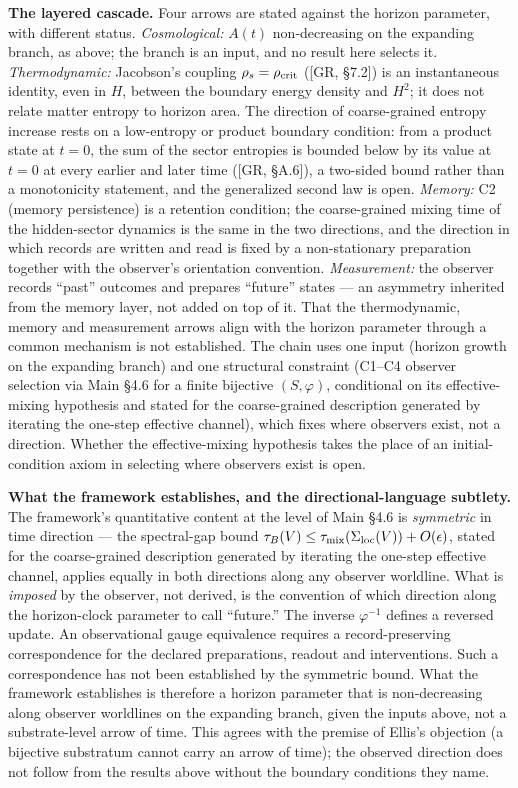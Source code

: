 \documentclass[
]{article}
\begin{document}
\textbf{The layered cascade.} Four arrows are stated against the horizon
parameter, with different status. \emph{Cosmological:} \(A(t)\)
non-decreasing on the expanding branch, as above; the branch is an
input, and no result here selects it. \emph{Thermodynamic:} Jacobson's
coupling \(\rho_s = \rho_{\rm crit}\) ({[}GR, §7.2{]}) is an
instantaneous identity, even in \(H\), between the boundary energy
density and \(H^2\); it does not relate matter entropy to horizon area.
The direction of coarse-grained entropy increase rests on a low-entropy
or product boundary condition: from a product state at \(t = 0\), the
sum of the sector entropies is bounded below by its value at \(t = 0\)
at every earlier and later time ({[}GR, §A.6{]}), a two-sided bound
rather than a monotonicity statement, and the generalized second law is
open. \emph{Memory:} C2 (memory persistence) is a retention condition;
the coarse-grained mixing time of the hidden-sector dynamics is the same
in the two directions, and the direction in which records are written
and read is fixed by a non-stationary preparation together with the
observer's orientation convention. \emph{Measurement:} the observer
records ``past'' outcomes and prepares ``future'' states --- an
asymmetry inherited from the memory layer, not added on top of it. That
the thermodynamic, memory and measurement arrows align with the horizon
parameter through a common mechanism is not established. The chain uses
one input (horizon growth on the expanding branch) and one structural
constraint (C1--C4 observer selection via Main §4.6 for a finite
bijective \((S,\varphi)\), conditional on its effective-mixing
hypothesis and stated for the coarse-grained description generated by
iterating the one-step effective channel), which fixes where observers
exist, not a direction. Whether the effective-mixing hypothesis takes
the place of an initial-condition axiom in selecting where observers
exist is open.

\textbf{What the framework establishes, and the directional-language
subtlety.} The framework's quantitative content at the level of Main
§4.6 is \emph{symmetric} in time direction --- the spectral-gap bound
\(\tau_B(V) \leq \tau_{\rm mix}(\Sigma_{\rm loc}(V)) + O(\epsilon)\),
stated for the coarse-grained description generated by iterating the
one-step effective channel, applies equally in both directions along any
observer worldline. What is \emph{imposed} by the observer, not derived,
is the convention of which direction along the horizon-clock parameter
to call ``future.'' The inverse \(\varphi^{-1}\) defines a reversed
update. An observational gauge equivalence requires a record-preserving
correspondence for the declared preparations, readout and interventions.
Such a correspondence has not been established by the symmetric bound.
What the framework establishes is therefore a horizon parameter that is
non-decreasing along observer worldlines on the expanding branch, given
the inputs above, not a substrate-level arrow of time. This agrees with
the premise of Ellis's objection (a bijective substratum cannot carry an
arrow of time); the observed direction does not follow from the results
above without the boundary conditions they name.
\end{document}
